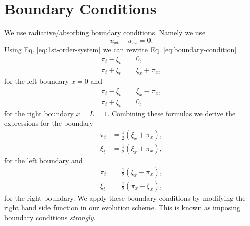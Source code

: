 \documentclass[reprint, prd, nofootinbib, superscriptaddress, floatfix]{revtex4-2}  %
\begin{document}
\section{Boundary Conditions}
We use radiative/absorbing boundary conditions. Namely we use
\begin{equation}
  \label{eq:boundary-condition}
  u_{xt} - u_{xx} = 0.
\end{equation}
Using Eq. \ref{eq:1st-order-system} we can rewrite Eq. \ref{eq:boundary-condition}
\begin{align}
  \label{eq:bc-left}
  \pi_t - \xi_t &= 0, \\
  \pi_t + \xi_t &= \xi_x + \pi_x,
\end{align}
for the left boundary $x=0$ and
\begin{align}
  \label{eq:bc-right}
  \pi_t - \xi_t &= \xi_x - \pi_x, \\
  \pi_t + \xi_t &= 0,
\end{align}
for the right boundary $x=L=1$. Combining these formulas we derive the expressions for the boundary
\begin{equation}
  \label{eq:rhs-bc-left}
  \begin{split}
    \pi_t &= \frac{1}{2} (\xi_x + \pi_x), \\
    \xi_t &= \frac{1}{2} (\xi_x + \pi_x),
  \end{split}
\end{equation}
for the left boundary and
\begin{equation}
  \label{eq:rhs-bc-right}
  \begin{split}
    \pi_t &= \frac{1}{2} (\xi_x - \pi_x), \\
    \xi_t &= \frac{1}{2} (\pi_x - \xi_x),
  \end{split}
\end{equation}
for the right boundary. We apply these boundary conditions by modifying the right hand side function in our evolution scheme. This is known as imposing boundary conditions \textit{strongly}.
\end{document}

